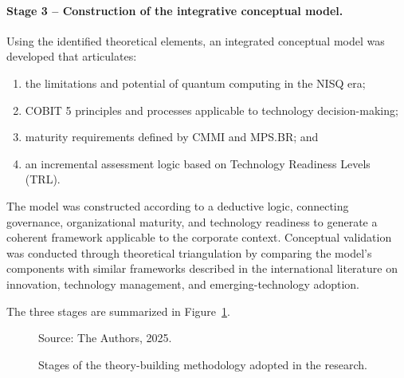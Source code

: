 \documentclass{icis}
\begin{document}
\paragraph{Stage 3 -- Construction of the integrative conceptual model.}
Using the identified theoretical elements, an integrated conceptual model was developed that articulates:
\begin{enumerate}[leftmargin=*]
    \item the limitations and potential of quantum computing in the NISQ era;
    \item COBIT 5 principles and processes applicable to technology decision-making;
    \item maturity requirements defined by CMMI and MPS.BR; and
    \item an incremental assessment logic based on Technology Readiness Levels (TRL).
\end{enumerate}

The model was constructed according to a deductive logic, connecting governance, organizational maturity, and technology readiness to generate a coherent framework applicable to the corporate context. Conceptual validation was conducted through theoretical triangulation by comparing the model's components with similar frameworks described in the international literature on innovation, technology management, and emerging-technology adoption.

The three stages are summarized in Figure~\ref{fig:method}.
\begin{figure}[htbp]
\centering
{}
\caption{Stages of the theory-building methodology adopted in the research.}
\label{fig:method}
\begin{flushright}\small Source: The Authors, 2025.\end{flushright}
\end{figure}
\end{document}
